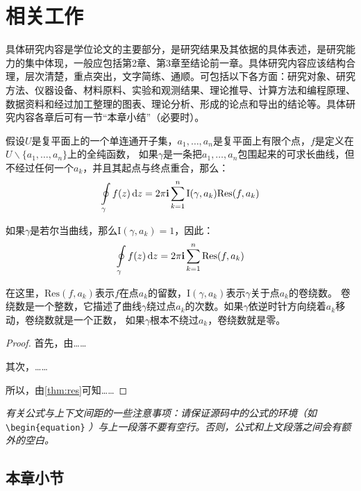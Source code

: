 
\chapter{相关工作}

具体研究内容是学位论文的主要部分，是研究结果及其依据的具体表述，是研究能力的集中体现，一般应包括第2章、第3章至结论前一章。具体研究内容应该结构合理，层次清楚，重点突出，文字简练、通顺。可包括以下各方面：研究对象、研究方法、仪器设备、材料原料、实验和观测结果、理论推导、计算方法和编程原理、数据资料和经过加工整理的图表、理论分析、形成的论点和导出的结论等。具体研究内容各章后可有一节“本章小结”（必要时）。

\begin{them}[留数定理]
\label{thm:res}
  假设$U$是复平面上的一个单连通开子集，$a_1,\ldots,a_n$是复平面上有限个点，$f$是定义在$U\backslash \{a_1,\ldots,a_n\}$上的全纯函数，
  如果$\gamma$是一条把$a_1,\ldots,a_n$包围起来的可求长曲线，但不经过任何一个$a_k$，并且其起点与终点重合，那么：
  \begin{equation}
    \label{eq:res}
    \ointop_{\gamma}f(z)\,\mathrm{d}z = 2\pi\mathbf{i}\sum^n_{k=1}\mathrm{I}(\gamma,a_k)\mathrm{Res}(f,a_k)
  \end{equation}

  如果$\gamma$是若尔当曲线，那么$\mathrm{I}(\gamma, a_k)=1$，因此：
  \begin{equation}
    \label{eq:resthm}
    \ointop_{\gamma}f(z)\,\mathrm{d}z = 2\pi\mathbf{i}\sum^n_{k=1}\mathrm{Res}(f,a_k)
  \end{equation}

  在这里，$\mathrm{Res}(f, a_k)$表示$f$在点$a_k$的留数，$\mathrm{I}(\gamma,a_k)$表示$\gamma$关于点$a_k$的卷绕数。
  卷绕数是一个整数，它描述了曲线$\gamma$绕过点$a_k$的次数。如果$\gamma$依逆时针方向绕着$a_k$移动，卷绕数就是一个正数，
  如果$\gamma$根本不绕过$a_k$，卷绕数就是零。
\end{them}

\begin{proof}
  首先，由……

  其次，……

  所以，由\autoref{thm:res}可知……
  \qedhere
\end{proof}

\textit{有关公式与上下文间距的一些注意事项：请保证源码中的公式的环境（如}
\\ \verb|\begin{equation}|
  \textit{）与上一段落不要有空行。否则，公式和上文段落之间会有额外的空白。}


\section{本章小节}
